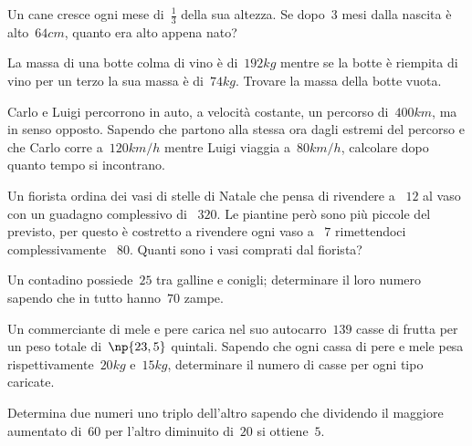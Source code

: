 \begin{multicols}{2}
\begin{esercizio}[\Ast, \croce]
\label{ese:16.72}
Un cane cresce ogni mese di~$\frac{1}{3}$ della sua altezza. Se dopo~$3$ mesi dalla nascita è alto~$64\unit{cm}$, quanto era alto appena nato?
\end{esercizio}

\begin{esercizio}[\Ast, \croce]
\label{ese:16.73}
La massa di una botte colma di vino è di~$192\unit{kg}$ mentre se la botte è riempita di vino per un terzo la sua massa è di~$74\unit{kg}$. Trovare la massa della botte vuota.
\end{esercizio}

\begin{esercizio}[\Ast, \croce]
\label{ese:16.74}
Carlo e Luigi percorrono in auto, a velocità costante, un percorso di~$400\unit{km}$, ma in senso opposto. Sapendo che partono alla stessa ora dagli estremi del percorso e che Carlo corre a~$120\unit{km/h}$ mentre Luigi viaggia a~$80\unit{km/h}$, calcolare dopo quanto tempo si incontrano.
\end{esercizio}

\begin{esercizio}[\Ast, \croce]
\label{ese:16.75}
Un fiorista ordina dei vasi di stelle di Natale che pensa di rivendere a \officialeuro~$12$ al vaso con un guadagno complessivo di \officialeuro~$320$. Le piantine però sono più piccole del previsto, per questo è costretto a rivendere ogni vaso a \officialeuro~$7$ rimettendoci complessivamente \officialeuro~$80$. Quanti sono i vasi comprati dal fiorista?
\end{esercizio}

\begin{esercizio}[\Ast, \croce]
\label{ese:16.76}
Un contadino possiede~$25$ tra galline e conigli; determinare il loro numero sapendo che in tutto hanno~$70$ zampe.
\end{esercizio}

\begin{esercizio}[\Ast, \croce]
\label{ese:16.77}
Un commerciante di mele e pere carica nel suo autocarro~$139$ casse di frutta per un peso totale di~$\np{23,5}$ quintali. Sapendo che ogni cassa di pere e mele pesa rispettivamente~$20\unit{kg}$ e~$15\unit{kg}$, determinare il numero di casse per ogni tipo caricate.
\end{esercizio}

\begin{esercizio}[\Ast, \croce]
\label{ese:16.78}
Determina due numeri uno triplo dell'altro sapendo che dividendo il maggiore aumentato di~$60$ per l'altro diminuito di~$20$ si ottiene~$5$.
\end{esercizio}


\end{multicols}
